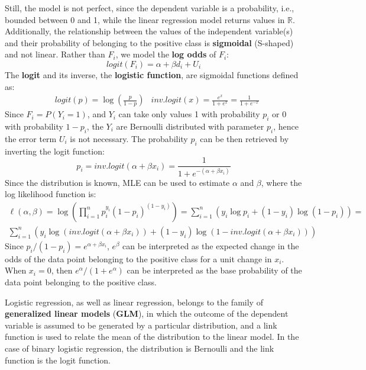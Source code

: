 Still, the model is not perfect, since the dependent variable is a probability, i.e., bounded between 0 and 1, while the linear regression model returns values in $\mathbb{R}$. Additionally, the relationship between the values of the independent variable(s) and their probability of belonging to the positive class is \textbf{sigmoidal} (S-shaped) and not linear. Rather than $F_i$, we model the \textbf{log odds} of $F_i$:
\begin{equation*}
    \textit{logit}(F_i) = \alpha + \beta d_i + U_i
\end{equation*}
The \textbf{logit} and its inverse, the \textbf{logistic function}, are sigmoidal functions defined as:
\begin{align*}
    &\textit{logit}(p) = \log\left(\frac{p}{1-p}\right) &\textit{inv.logit}(x) = \frac{e^x}{1+e^x} = \frac{1}{1+e^{-x}}
\end{align*}
Since $F_i = P(Y_i = 1)$, and $Y_i$ can take only values 1 with probability $p_i$ or 0 with probability $1-p_i$, the $Y_i$ are Bernoulli distributed with parameter $p_i$, hence the error term $U_i$ is not necessary. The probability $p_i$ can be then retrieved by inverting the logit function:
\begin{equation*}
    p_i = \textit{inv.logit}(\alpha + \beta x_i) = \frac{1}{1 + e^{-(\alpha + \beta x_i)}}
\end{equation*}
Since the distribution is known, MLE can be used to estimate $\alpha$ and $\beta$, where the log likelihood function is:
\begin{gather*}
    \ell(\alpha, \beta) = \log \left(\prod_{i=1}^n p_i^{y_i} (1-p_i)^{(1-y_i)}  \right) = \sum_{i=1}^n (y_i \log p_i + (1-y_i) \log(1-p_i)) =\\
    \sum_{i=1}^n (y_i \log(\textit{inv.logit}(\alpha + \beta x_i)) + (1-y_i) \log(1-\textit{inv.logit}(\alpha + \beta x_i)))
\end{gather*}
Since $p_i/(1-p_i) = e^{\alpha + \beta x_i}$, $e^{\beta}$ can be interpreted as the expected change in the odds of the data point belonging to the positive class for a unit change in $x_i$. When $x_i = 0$, then $e^{\alpha}/(1 + e^{\alpha})$ can be interpreted as the base probability of the data point belonging to the positive class.

Logistic regression, as well as linear regression, belongs to the family of \textbf{generalized linear models} (\textbf{GLM}), in which the outcome of the dependent variable is assumed to be generated by a particular distribution, and a link function is used to relate the mean of the distribution to the linear model. In the case of binary logistic regression, the distribution is Bernoulli and the link function is the logit function.

